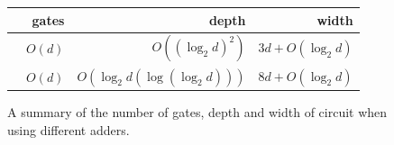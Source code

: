 \documentclass[notitlepage]{article}
\theoremstyle{definition}
\begin{document}
\begin{figure}
    \centering
    \begin{tabular}{lrrr}
        \toprule
                                    & gates      & depth & width\\
        \midrule
        \cite{cuccaro2004new}       & $O(d)$    & $O\left({(\log_{2}d)}^{2}\right)$ & $3d + O(\log_{2}d)$\\ %
        \cite{Takahashi:2008:FQC}   & $O(d)$    & $O\left(\log_{2}d\left(\log(\log_{2}d)\right)\right)$ & $8d + O(\log_{2}d)$\\ %
        \bottomrule
    \end{tabular}
    \caption{A summary of the number of gates, depth and width of circuit when using different adders.}\label{tab:GDW}
\end{figure}



\end{document}
